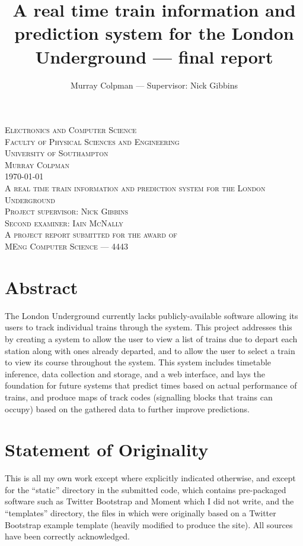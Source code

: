 \documentclass[a4paper,12pt,twoside]{report}
\title{A real time train information and prediction system for the London Underground --- final report}
\author{Murray Colpman --- Supervisor: Nick Gibbins}
\begin{document}
\begin{titlepage}
  \begin{center}
    \textsc{\Large Electronics and Computer Science}\\
    \textsc{\Large Faculty of Physical Sciences and Engineering}\\
    \textsc{\Large University of Southampton}\\[1.5cm]
    \textsc{\Large Murray Colpman}\\
    \textsc{\Large \today}\\[1.5cm]
    \textsc{\LARGE A real time train information and prediction system for the London Underground}\\[1.5cm]
    \textsc{\large Project supervisor: Nick Gibbins}\\
    \textsc{\large Second examiner: Iain McNally}\\[1.5cm]
    \textsc{\large A project report submitted for the award of}\\
    \textsc{\large MEng Computer Science --- 4443}
  \end{center}
\end{titlepage}

\chapter*{Abstract}

The London Underground currently lacks publicly-available software allowing its
users to track individual trains through the system. This project addresses
this by creating a system to allow the user to view a list of trains due to
depart each station along with ones already departed, and to allow the user to
select a train to view its course throughout the system. This system includes
timetable inference, data collection and storage, and a web interface, and lays
the foundation for future systems that predict times based on actual
performance of trains, and produce maps of track codes (signalling blocks that
trains can occupy) based on the gathered data to further improve predictions.

\pagebreak

\tableofcontents

\pagebreak

\chapter*{Statement of Originality}

This is all my own work except where explicitly indicated otherwise, and except
for the ``static'' directory in the submitted code, which contains pre-packaged
software such as Twitter Bootstrap and Moment which I did not write, and the
``templates'' directory, the files in which were originally based on a Twitter
Bootstrap example template (heavily modified to produce the site). All sources
have been correctly acknowledged. 
\end{document}
